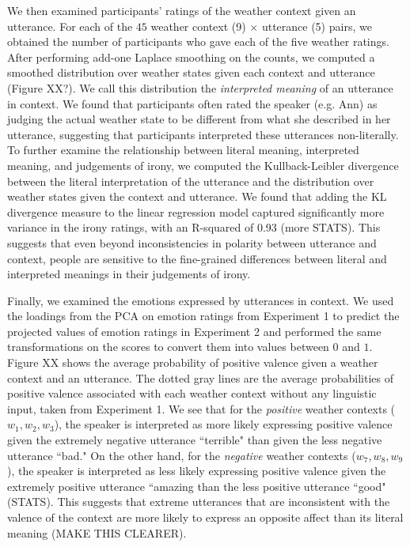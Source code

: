 \documentclass[10pt,letterpaper]{article}
\begin{document}
We then examined participants' ratings of the weather context given an utterance. For each of the $45$ weather context (9) $\times$ utterance (5) pairs, we obtained the number of participants who gave each of the five weather ratings. After performing add-one Laplace smoothing on the counts, we computed a smoothed distribution over weather states given each context and utterance (Figure XX?). We call this distribution the \emph{interpreted meaning} of an utterance in context. We found that participants often rated the speaker (e.g. Ann) as judging the actual weather state to be different from what she described in her utterance, suggesting that participants interpreted these utterances non-literally. To further examine the relationship between literal meaning, interpreted meaning, and judgements of irony, we computed the Kullback-Leibler divergence between the literal interpretation of the utterance and the distribution over weather states given the context and utterance. 
We found that adding the KL divergence measure to the linear regression model captured significantly more variance in the irony ratings, with an R-squared of 0.93 (more STATS). 
This suggests that even beyond inconsistencies in polarity between utterance and context, people are sensitive to the fine-grained differences between literal and interpreted meanings in their judgements of irony.

Finally, we examined the emotions expressed by utterances in context. We used the loadings from the PCA on emotion ratings from Experiment 1 to predict the projected values of emotion ratings in Experiment 2 and performed the same transformations on the scores to convert them into values between $0$ and $1$. Figure XX shows the average probability of positive valence given a weather context and an utterance. The dotted gray lines are the average probabilities of positive valence associated with each weather context without any linguistic input, taken from Experiment 1. We see that for the \emph{positive} weather contexts ($w_1, w_2, w_3$), the speaker is interpreted as more likely expressing positive valence given the extremely negative utterance ``terrible" than given the less negative utterance ``bad." On the other hand, for the \emph{negative} weather contexts ($w_7, w_8, w_9$), the speaker is interpreted as less likely expressing positive valence given the extremely positive utterance ``amazing than the less positive utterance ``good" (STATS). This suggests that extreme utterances that are inconsistent with the valence of the context are more likely to express an opposite affect than its literal meaning (MAKE THIS CLEARER).
\end{document}
